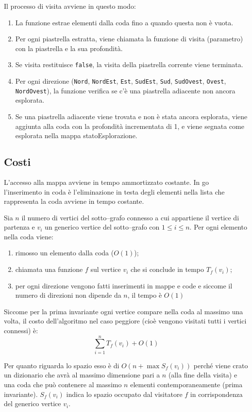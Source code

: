 \documentclass[a4paper,12pt]{article}
\begin{document}
	Il processo di visita avviene in questo modo:
	\begin{enumerate}
		\item La funzione estrae elementi dalla coda fino a quando questa non è vuota.
		\item Per ogni piastrella estratta, viene chiamata la funzione di visita (parametro) con la piastrella e la sua profondità.
		\item Se visita restituisce \texttt{false}, la visita della piastrella corrente viene terminata.
		\item Per ogni direzione (\texttt{Nord}, \texttt{NordEst}, \texttt{Est}, \texttt{SudEst}, \texttt{Sud}, \texttt{SudOvest}, \texttt{Ovest}, \texttt{NordOvest}), la funzione verifica se c'è una piastrella adiacente non ancora esplorata.
		\item Se una piastrella adiacente viene trovata e non è stata ancora esplorata, viene aggiunta alla coda con la profondità incrementata di 1, e viene segnata come esplorata nella mappa statoEsplorazione.
	\end{enumerate}
	
	\subsection{Costi}
	L'accesso alla mappa avviene in tempo ammortizzato costante.
	In go l'inserimento in coda è l'eliminazione in testa degli elementi nella lista che rappresenta la coda avviene in tempo costante.
	
	Sia \(n\) il numero di vertici del sotto--grafo connesso a cui appartiene il vertice di partenza e \(v_i\) un generico vertice del sotto--grafo con \(1 \le i \le n\).
	Per ogni elemento nella coda viene:
	\begin{enumerate}
		\item rimosso un elemento dalla coda (\(O(1)\));
		\item chiamata una funzione \(f\) sul vertice \(v_i\) che si conclude in tempo \(T_f(v_i)\);
		\item per ogni direzione vengono fatti inserimenti in mappe e code e siccome il numero di direzioni non dipende da \(n\), il tempo è \(O(1)\)
	\end{enumerate}
	Siccome per la prima invariante ogni vertice compare nella coda al massimo una volta, il costo  dell'algoritmo nel caso peggiore (cioè vengono visitati tutti i vertici connessi) è:
	\[
		\sum_{i = 1}^{n}{T_f(v_i)} + O(1)
	\]
	
	Per quanto riguarda lo spazio esso è di \(O(n + \max{S_f(v_i)})\) perché viene crato un dizionario che avrà al massimo dimensione pari a \(n\) (alla fine della visita) e una coda che può contenere al massimo \(n\) elementi contemporaneamente (prima invariante). \(S_f(v_i)\) indica lo spazio occupato dal visitatore \(f\) in corrispondenza del generico vertice \(v_i\).
	
\end{document}
